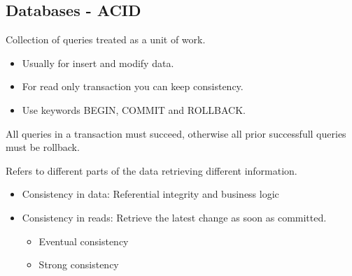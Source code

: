 \documentclass[../main.tex]{subfiles}
\begin{document}
\subsection{Databases - ACID}
\begin{definition}[Transaction]
    Collection of queries treated as a unit of work.
    \begin{itemize}
        \item Usually for insert and modify data.
        \item For read only transaction you can keep consistency.
        \item Use keywords BEGIN, COMMIT and ROLLBACK.
    \end{itemize}
\end{definition}

\begin{definition}[Atomicity]
    All queries in a transaction must succeed, otherwise all prior successfull queries must be rollback.
\end{definition}

\begin{definition}[Consistency]
    Refers to different parts of the data retrieving different information.
    \begin{itemize}
        \item Consistency in data: Referential integrity and business logic
        \item Consistency in reads: Retrieve the latest change as soon as committed.
        \begin{itemize}
            \item Eventual consistency
            \item Strong consistency
        \end{itemize}
    \end{itemize}
\end{definition}
\end{document}
